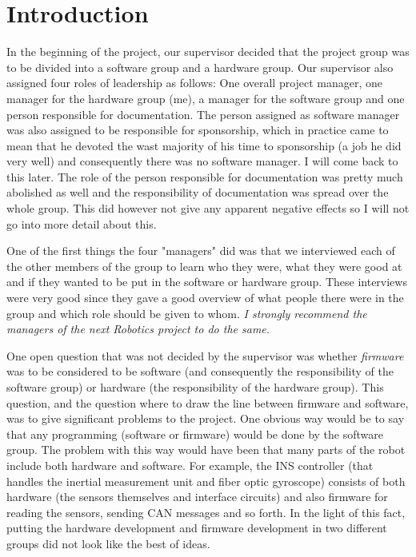 
\section{Introduction}\label{sec:introduction}
In the beginning of the project, our supervisor decided that the project group was to be divided into a software group and a hardware group. Our supervisor also assigned four roles of leadership as follows: One overall project manager, one manager for the hardware group (me), a manager for the software group and one person responsible for documentation. \newline
The person assigned as software manager was also assigned to be responsible for sponsorship, which in practice came to mean that he devoted the wast majority of his time to sponsorship (a job he did very well) and consequently there was no software manager. I will come back to this later. \newline
The role of the person responsible for documentation was pretty much abolished as well and the responsibility of documentation was spread over the whole group. This did however not give any apparent negative effects so I will not go into more detail about this.

One of the first things the four "managers" did was that we interviewed each of the other members of the group to learn who they were, what they were good at and if they wanted to be put in the software or hardware group. These interviews were very good since they gave a good overview of what people there were in the group and which role should be given to whom. \emph{I strongly recommend the managers of the next Robotics project to do the same.}

One open question that was not decided by the supervisor was whether \emph{firmware} was to be considered to be software (and consequently the responsibility of the software group) or hardware (the responsibility of the hardware group). This question, and the question where to draw the line between firmware and software, was to give significant problems to the project. \newline
One obvious way would be to say that any programming (software or firmware) would be done by the software group. The problem with this way would have been that many parts of the robot include both hardware and software. For example, the INS controller (that handles the inertial measurement unit and fiber optic gyroscope) consists of both hardware (the sensors themselves and interface circuits) and also firmware for reading the sensors, sending CAN messages and so forth. In the light of this fact, putting the hardware development and firmware development in two different groups did not look like the best of ideas.

